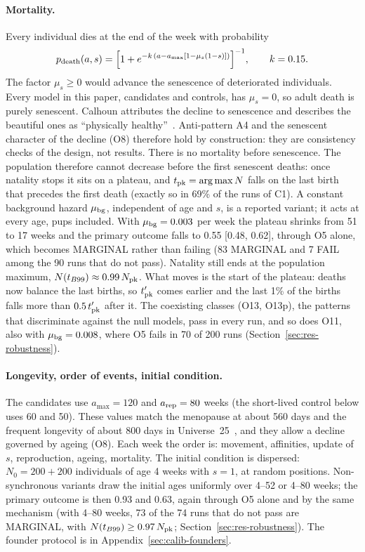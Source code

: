 \paragraph{Mortality.}
Every individual dies at the end of the week with probability
\begin{equation}
  p_{\rm death}(a,s)=\Bigl[1+e^{-k\,(a-a_{\max}[1-\mu_s(1-s)])}\Bigr]^{-1},\qquad k=0.15 .
  \label{eq:model-mort}
\end{equation}
The factor $\mu_s\ge0$ would advance the senescence of deteriorated individuals. Every model in this paper,
candidates and controls, has $\mu_s=0$, so adult death is purely senescent. Calhoun attributes the decline to senescence and describes the beautiful ones as
``physically healthy''~\cite{Calhoun1973}. Anti-pattern A4 and the senescent character of the decline (O8) therefore
hold by construction: they are consistency checks of the design, not results.
There is no mortality before senescence. The population therefore cannot decrease before the first senescent deaths:
once natality stops it sits on a plateau, and $t_{\rm pk}=\arg\max N$ falls on the last birth that precedes the first
death (exactly so in 69\% of the runs of \textsf{C1}). A constant background hazard $\mu_{\rm bg}$, independent of age
and $s$, is a reported variant; it acts at every age, pups included. With $\mu_{\rm bg}=0.003$ per week the plateau
shrinks from 51 to 17 weeks and the primary outcome falls to 0.55 [0.48, 0.62], through O5 alone, which becomes
MARGINAL rather than failing (83 MARGINAL and 7 FAIL among the 90 runs that do not pass). Natality still ends at the
population maximum, $N(t_{B99})\approx0.99\,N_{\rm pk}$. What moves is the start of the plateau: deaths now balance the
last births, so $t'_{\rm pk}$ comes earlier and the last 1\% of the births falls more than $0.5\,t'_{\rm pk}$ after
it. The coexisting classes (O13, O13p), the patterns that discriminate against the null models, pass in every
run, and so does O11, also with $\mu_{\rm bg}=0.008$, where O5 fails in 70 of 200 runs
(Section~\ref{sec:res-robustness}).

\paragraph{Longevity, order of events, initial condition.}
The candidates use $a_{\max}=120$ and $a_{\rm rep}=80$ weeks (the short-lived control below uses 60 and 50). These
values match the menopause at about 560 days and the frequent longevity of about 800 days in Universe~25~\cite{Calhoun1973},
and they allow a decline governed by ageing (O8). Each week the order is: movement, affinities, update of
$s$, reproduction, ageing, mortality. The initial condition is dispersed: $N_0=200+200$
individuals of age 4 weeks with $s=1$, at random positions. Non-synchronous variants draw the initial ages
uniformly over 4--52 or 4--80 weeks; the primary outcome is then 0.93 and 0.63, again through O5 alone and by the
same mechanism (with 4--80 weeks, 73 of the 74 runs that do not pass are MARGINAL, with
$N(t_{B99})\ge0.97\,N_{\rm pk}$; Section~\ref{sec:res-robustness}). The founder protocol is in Appendix~\ref{sec:calib-founders}.

